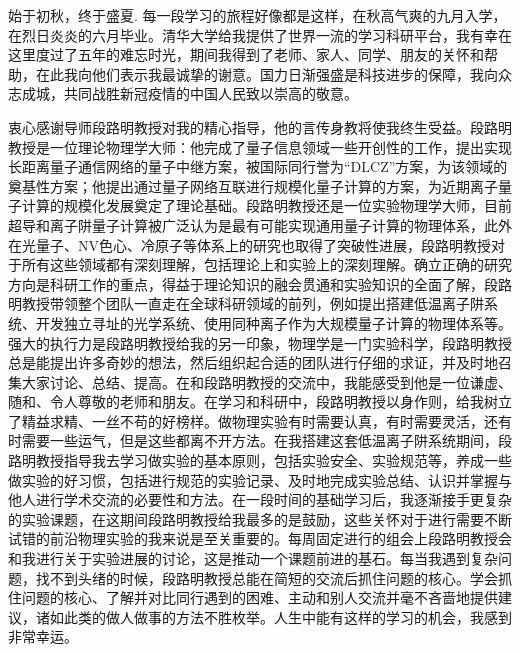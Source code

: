 
\begin{acknowledgements}
  始于初秋，终于盛夏. 每一段学习的旅程好像都是这样，在秋高气爽的九月入学，在烈日炎炎的六月毕业。清华大学给我提供了世界一流的学习科研平台，我有幸在这里度过了五年的难忘时光，期间我得到了老师、家人、同学、朋友的关怀和帮助，在此我向他们表示我最诚挚的谢意。国力日渐强盛是科技进步的保障，我向众志成城，共同战胜新冠疫情的中国人民致以崇高的敬意。

  衷心感谢导师段路明教授对我的精心指导，他的言传身教将使我终生受益。段路明教授是一位理论物理学大师：他完成了量子信息领域一些开创性的工作，提出实现长距离量子通信网络的量子中继方案，被国际同行誉为“DLCZ”方案，为该领域的奠基性方案；他提出通过量子网络互联进行规模化量子计算的方案，为近期离子量子计算的规模化发展奠定了理论基础。段路明教授还是一位实验物理学大师，目前超导和离子阱量子计算被广泛认为是最有可能实现通用量子计算的物理体系，此外在光量子、NV色心、冷原子等体系上的研究也取得了突破性进展，段路明教授对于所有这些领域都有深刻理解，包括理论上和实验上的深刻理解。确立正确的研究方向是科研工作的重点，得益于理论知识的融会贯通和实验知识的全面了解，段路明教授带领整个团队一直走在全球科研领域的前列，例如提出搭建低温离子阱系统、开发独立寻址的光学系统、使用同种离子作为大规模量子计算的物理体系等。强大的执行力是段路明教授给我的另一印象，物理学是一门实验科学，段路明教授总是能提出许多奇妙的想法，然后组织起合适的团队进行仔细的求证，并及时地召集大家讨论、总结、提高。在和段路明教授的交流中，我能感受到他是一位谦虚、随和、令人尊敬的老师和朋友。在学习和科研中，段路明教授以身作则，给我树立了精益求精、一丝不苟的好榜样。做物理实验有时需要认真，有时需要灵活，还有时需要一些运气，但是这些都离不开方法。在我搭建这套低温离子阱系统期间，段路明教授指导我去学习做实验的基本原则，包括实验安全、实验规范等，养成一些做实验的好习惯，包括进行规范的实验记录、及时地完成实验总结、认识并掌握与他人进行学术交流的必要性和方法。在一段时间的基础学习后，我逐渐接手更复杂的实验课题，在这期间段路明教授给我最多的是鼓励，这些关怀对于进行需要不断试错的前沿物理实验的我来说是至关重要的。每周固定进行的组会上段路明教授会和我进行关于实验进展的讨论，这是推动一个课题前进的基石。每当我遇到复杂问题，找不到头绪的时候，段路明教授总能在简短的交流后抓住问题的核心。学会抓住问题的核心、了解并对比同行遇到的困难、主动和别人交流并毫不吝啬地提供建议，诸如此类的做人做事的方法不胜枚举。人生中能有这样的学习的机会，我感到非常幸运。


\end{acknowledgements}
